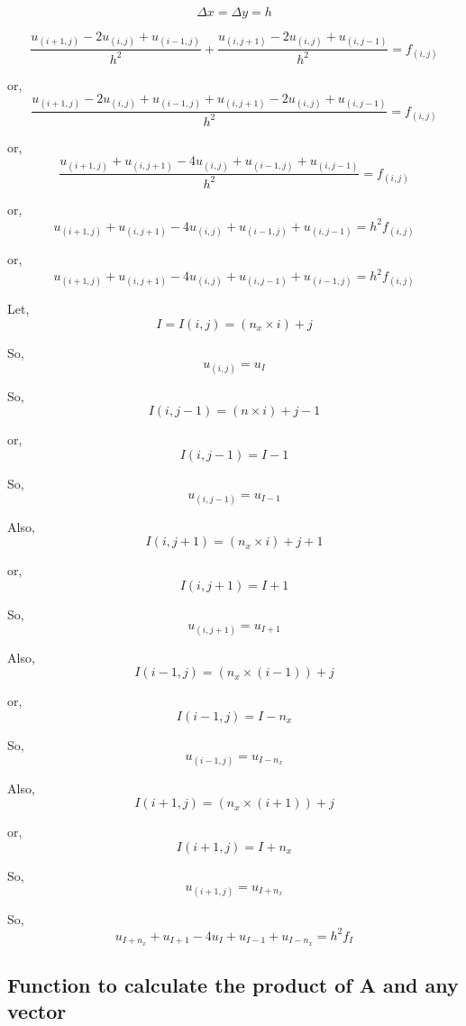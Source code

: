 \documentclass[11pt]{article}
\begin{document}
    \[\Delta x = \Delta y = h\]

    \[\frac{u_{(i+1,j)} - 2u_{(i,j)} + u_{(i-1,j)}}{h^2 } + \frac{u_{(i,j+1)} - 2u_{(i,j)} + u_{(i,j-1)}}{h^2 } = f_{(i,j)}\]

    or,
\[\frac{u_{(i+1,j)} - 2u_{(i,j)} + u_{(i-1,j)} + u_{(i,j+1)} - 2u_{(i,j)} + u_{(i,j-1)}}{h^2 } = f_{(i,j)}\]

    or,
\[\frac{u_{(i+1,j)} + u_{(i,j+1)} - 4u_{(i,j)} + u_{(i-1,j)} + u_{(i,j-1)}}{h^2 } = f_{(i,j)}\]

    or,
\[u_{(i+1,j)} + u_{(i,j+1)} - 4u_{(i,j)} + u_{(i-1,j)} + u_{(i,j-1)} = h^2f_{(i,j)}\]

    or,
\[u_{(i+1,j)} + u_{(i,j+1)} - 4u_{(i,j)} + u_{(i,j-1)} + u_{(i-1,j)} = h^2f_{(i,j)}\]

    Let, \[I = I(i,j) = (n_x \times i) + j\]

    So, \[u_{(i,j)} = u_{I}\]

    So, \[I(i,j-1) = (n \times i) + j - 1\]

    or, \[I(i,j-1) = I - 1\]

    So, \[u_{(i,j-1)} = u_{I-1}\]

    Also, \[I(i,j+1) = (n_x \times i) + j + 1\]

    or, \[I(i,j+1) = I + 1\]

    So, \[u_{(i,j+1)} = u_{I+1}\]

    Also, \[I(i-1,j) = (n_x \times (i-1)) + j\]

    or, \[I(i-1,j) = I - n_x\]

    So, \[u_{(i-1,j)} = u_{I-n_x}\]

    Also, \[I(i+1,j) = (n_x \times (i+1)) + j\]

    or, \[I(i+1,j) = I + n_x\]

    So, \[u_{(i+1,j)} = u_{I + n_x}\]

    So, \[u_{I+n_x} + u_{I+1} - 4u_{I} + u_{I-1} + u_{I-n_x} = h^2f_{I}\]

    \hypertarget{function-to-calculate-the-product-of-a-and-any-vector}{%
\subsection{Function to calculate the product of A and any
vector}\label{function-to-calculate-the-product-of-a-and-any-vector}}
\end{document}
